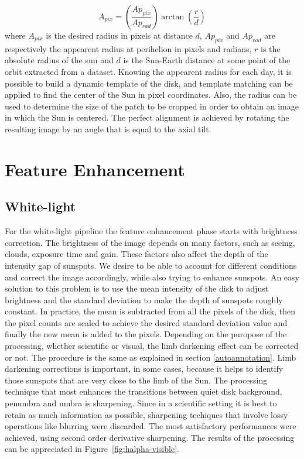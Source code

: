\begin{equation}
  A_{pix} = \left( \frac{Ap_{pix}}{Ap_{rad}} \right)  \arctan{\left(\frac{r}{d}\right)}
\end{equation}
where $A_{pix}$ is the desired radius in pixels at distance $d$, $Ap_{pix}$ and $Ap_{rad}$ are respectively the appearent radius at perihelion in pixels and radians, $r$ is the absolute radius of the sun and $d$ is the Sun-Earth distance at some point of the orbit extracted from a dataset.
\bigbreak
\noindent Knowing the appearent radius for each day, it is possible to build a dynamic template of the disk, and template matching can be applied to find the center of the Sun in pixel coordinates. Also, the radius can be used to determine the size of the patch to be cropped in order to obtain an image in which the Sun is centered. The perfect alignment is achieved by rotating the resulting image by an angle that is equal to the axial tilt.

\section{Feature Enhancement}
\subsection{White-light}
\noindent For the white-light pipeline the feature enhancement phase starts with brightness correction. The brightness of the image depends on many factors, such as seeing, clouds, exposure time and gain. These factors also affect the depth of the intensity gap of sunspots. We desire to be able to account for different conditions and correct the image accordingly, while also trying to enhance sunspots.
\bigbreak
\noindent An easy solution to this problem is to use the mean intensity of the disk to adjust brightness and the standard deviation to make the depth of sunspots roughly constant. In practice, the mean is subtracted from all the pixels of the disk, then the pixel counts are scaled to achieve the desired standard deviation value and finally the new mean is added to the pixels.
\bigbreak
\noindent Depending on the puropose of the processing, whether scientific or visual, the limb darkening effect can be corrected or not. The procedure is the same as explained in section \ref{autoannotation}. Limb darkening corrections is important, in some cases, because it helps to identify those sunspots that are very close to the limb of the Sun.
\bigbreak
\noindent The processing technique that most enhances the transitions between quiet disk background, penumbra and umbra is sharpening. Since in a scientific setting it is best to retain as much information as possible, sharpening techiques that involve lossy operations like blurring were discarded. The most satisfactory performances were achieved, using second order derivative sharpening.
\bigbreak
\noindent The results of the processing can be appreciated in Figure~\ref{fig:halpha-visible}.

